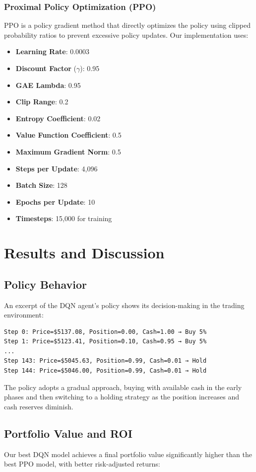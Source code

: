 \documentclass[11pt]{article}
\begin{document}
\subsubsection{Proximal Policy Optimization (PPO)}
PPO is a policy gradient method that directly optimizes the policy using clipped probability ratios to prevent excessive policy updates. Our implementation uses:

\begin{itemize}
  \item \textbf{Learning Rate}: 0.0003
  \item \textbf{Discount Factor} (\(\gamma\)): 0.95
  \item \textbf{GAE Lambda}: 0.95
  \item \textbf{Clip Range}: 0.2
  \item \textbf{Entropy Coefficient}: 0.02
  \item \textbf{Value Function Coefficient}: 0.5
  \item \textbf{Maximum Gradient Norm}: 0.5
  \item \textbf{Steps per Update}: 4,096
  \item \textbf{Batch Size}: 128
  \item \textbf{Epochs per Update}: 10
  \item \textbf{Timesteps}: 15,000 for training
\end{itemize}

\section{Results and Discussion}

\subsection{Policy Behavior}
An excerpt of the DQN agent's policy shows its decision-making in the trading environment:
\begin{verbatim}
Step 0: Price=$5137.08, Position=0.00, Cash=1.00 → Buy 5%
Step 1: Price=$5123.41, Position=0.10, Cash=0.95 → Buy 5%
...
Step 143: Price=$5045.63, Position=0.99, Cash=0.01 → Hold
Step 144: Price=$5046.00, Position=0.99, Cash=0.01 → Hold
\end{verbatim}
The policy adopts a gradual approach, buying with available cash in the early phases and then switching to a holding strategy as the position increases and cash reserves diminish.

\subsection{Portfolio Value and ROI}
Our best DQN model achieves a final portfolio value significantly higher than the best PPO model, with better risk-adjusted returns:
\end{document}
